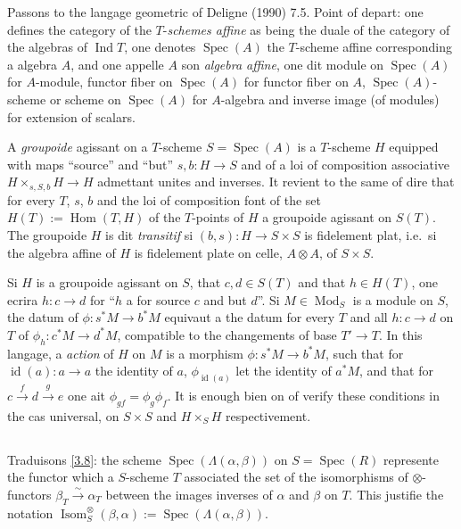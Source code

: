 \documentclass[11pt,a4paper]{article}
\theoremstyle{plain}
\theoremstyle{definition}
\DeclareMathOperator{\Hom}{Hom}
\DeclareMathOperator{\Spec}{Spec}
\DeclareMathOperator{\Ind}{Ind}
\DeclareMathOperator{\id}{id}
\newcommand{\Isom}{\operatorname{Isom}}
\newcommand{\Mod}{\operatorname{Mod}}
\begin{document}
Passons to the langage geometric of Deligne (1990) 7.5. Point of depart: one defines the category of the $T$-\emph{schemes affine} as being the duale of the category of the algebras of $\Ind T$, one denotes $\Spec(A)$ the $T$-scheme affine corresponding a algebra $A$, and one appelle $A$ son \emph{algebra affine}, one dit module on $\Spec(A)$ for $A$-module, functor fiber on $\Spec(A)$ for functor fiber on $A$, $\Spec(A)$-scheme or scheme on $\Spec(A)$ for $A$-algebra and inverse image (of modules) for extension of scalars.

A \emph{groupoide} agissant on a $T$-scheme $S=\Spec(A)$ is a $T$-scheme $H$ equipped with maps ``source'' and ``but'' $s,b:H\to S$ and of a loi of composition associative $H\times_{s,S,b}H\to H$ admettant unites and inverses. It revient to the same of dire that for every $T$, $s$, $b$ and the loi of composition font of the set $H(T):=\Hom(T,H)$ of the $T$-points of $H$ a groupoide agissant on $S(T)$. The groupoide $H$ is dit \emph{transitif} si $(b,s):H\to S\times S$ is fidelement plat, i.e.~si the algebra affine of $H$ is fidelement plate on celle, $A\otimes A$, of $S\times S$.

Si $H$ is a groupoide agissant on $S$, that $c,d\in S(T)$ and that $h\in H(T)$, one ecrira $h:c\to d$ for ``$h$ a for source $c$ and but $d$''. Si $M\in\Mod_S$ is a module on $S$, the datum of $\phi:s^*M\to b^*M$ equivaut a the datum for every $T$ and all $h:c\to d$ on $T$ of $\phi_h:c^*M\to d^*M$, compatible to the changements of base $T'\to T$. In this langage, a \emph{action} of $H$ on $M$ is a morphism $\phi:s^*M\to b^*M$, such that for $\id(a):a\to a$ the identity of $a$, $\phi_{\id(a)}$ let the identity of $a^*M$, and that for $c\xrightarrow{f}d\xrightarrow{g}e$ one ait $\phi_{gf}=\phi_g\phi_f$. It is enough bien on of verify these conditions in the cas universal, on $S\times S$ and $H\times_S H$ respectivement.

\subsection{}\label{3.10}

Traduisons \ref{3.8}: the scheme $\Spec(\Lambda(\alpha,\beta))$ on $S=\Spec(R)$ represente the functor which a $S$-scheme $T$ associated the set of the isomorphisms of $\otimes$-functors $\beta_T\xrightarrow{\sim}\alpha_T$ between the images inverses of $\alpha$ and $\beta$ on $T$. This justifie the notation $\Isom^\otimes_S(\beta,\alpha):=\Spec(\Lambda(\alpha,\beta))$.
\end{document}

